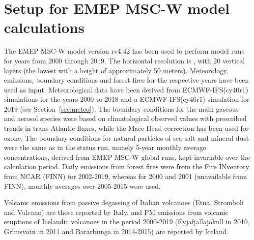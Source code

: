 

\section{\label{EMEPmodelcalc}{Setup for EMEP MSC-W model calculations}}
The EMEP MSC-W model version rv4.42 has been used to perform model runs for years from 2000 through 2019. The horizontal resolution is \resZO, with 20 vertical layers (the lowest with a height of approximately 50 meters).
 Meteorology, emissions, boundary conditions and forest fires for the respective years have been used as input. Meteorological data have been
 derived from ECMWF-IFS(cy40r1) simulations for the years 2000 to 2018 and a ECMWF-IFS(cy46r1) simulation for 2019 (see Section~\ref{sec:meteo}). 
 The boundary conditions for the main gaseous and aerosol species were based on climatological observed values with prescribed trends in trans-Atlantic fluxes, while the Mace
Head correction has been used for ozone. The boundary conditions for natural particles of
sea salt and mineral dust were the same as in the status run, namely 5-year monthly average
concentrations, derived from EMEP MSC-W global runs, kept invariable over the calculation
period.
Daily emissions from forest fires were from the Fire INventory from NCAR (FINN) for 2002-2019,
whereas for 2000 and 2001 (unavailable from FINN), monthly averages over 2005-2015 were
used.

Volcanic \sox emissions from passive degassing of Italian volcanoes (Etna,
Stromboli and Vulcano) are those reported by
Italy. \sox and PM emissions from volcanic eruptions of Icelandic volcanoes in the period 2000-2019 (Eyjafjallaj\"okull in 2010, Gr{\'{\i}}msv{\"{o}}tn in 2011  and  Bar\dh{}arbunga in 2014-2015) are reported by Iceland. 
 
